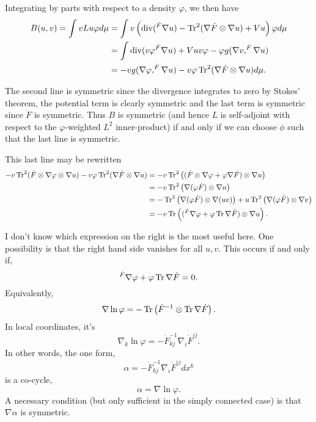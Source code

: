 \documentclass{amsart}
\begin{document}
Integrating by parts with respect to a density \(\varphi\), we then have
\begin{align*}
B(u, v) = \int v Lu \varphi d\mu &= \int v\left(\operatorname{div} (^{\dot{F}}\nabla u) - \operatorname{Tr}^2 (\nabla \dot{F} \otimes \nabla u) + V u\right) \varphi d\mu \\
&= \int \operatorname{div} (v\varphi ^{\dot{F}}\nabla u) + V u v \varphi - \varphi g(\nabla v, ^{\dot{F}}\nabla u) \\
&= - v g (\nabla \varphi, ^{\dot{F}}\nabla u) - v\varphi \operatorname{Tr}^2 (\nabla \dot{F} \otimes \nabla u) d\mu.
\end{align*}

The second line is symmetric since the divergence integrates to zero by Stokes' theorem, the potential term is clearly symmetric and the last term is symmetric since \(\dot{F}\) is symmetric. Thus \(B\) is symmetric (and hence \(L\) is self-adjoint with respect to the \(\varphi\)-weighted \(L^2\) inner-product) if and only if we can choose \(\phi\) such that the last line is symmetric.

This last line may be rewritten
\begin{align*}
- v \operatorname{Tr}^2(\dot{F} \otimes \nabla \varphi \otimes \nabla u) - v \varphi \operatorname{Tr}^2(\nabla \dot{F} \otimes \nabla u) &= -v \operatorname{Tr}^2 \left((\dot{F} \otimes \nabla \varphi + \varphi \nabla \dot{F}) \otimes \nabla u\right) \\
&= -v \operatorname{Tr}^2 \left(\nabla (\varphi \dot{F}) \otimes \nabla u\right) \\
&= - \operatorname{Tr}^2 \left(\nabla (\varphi \dot{F}) \otimes \nabla (uv)\right) + u \operatorname{Tr}^2 \left(\nabla (\varphi \dot{F}) \otimes \nabla v\right) \\
&= - v \operatorname{Tr}\left((^{\dot{F}} \nabla \varphi + \varphi \operatorname{Tr} \nabla \dot{F}) \otimes \nabla u\right).
\end{align*}

I don't know which expression on the right is the most useful here. One possibility is that the right hand side vanishes for all \(u, v\). This occurs if and only if,
\[
^{\dot{F}} \nabla \varphi + \varphi \operatorname{Tr} \nabla \dot{F} = 0.
\]
Equivalently,
\[
\nabla \ln \varphi = - \operatorname{Tr} \left(\dot{F}^{-1} \otimes \operatorname{Tr} \nabla \dot{F}\right).
\]
In local coordinates, it's
\[
\nabla_k \ln \varphi = -\dot{F}^{-1}_{kj} \nabla_i \dot{F}^{ij}.
\]
In other words, the one form,
\[
\alpha = -\dot{F}^{-1}_{kj} \nabla_i \dot{F}^{ij} dx^k
\]
is a co-cycle,
\[
\alpha = \nabla \ln \varphi.
\]
A necessary condition (but only sufficient in the simply connected case) is that \(\nabla \alpha\) is symmetric.
\end{document}
